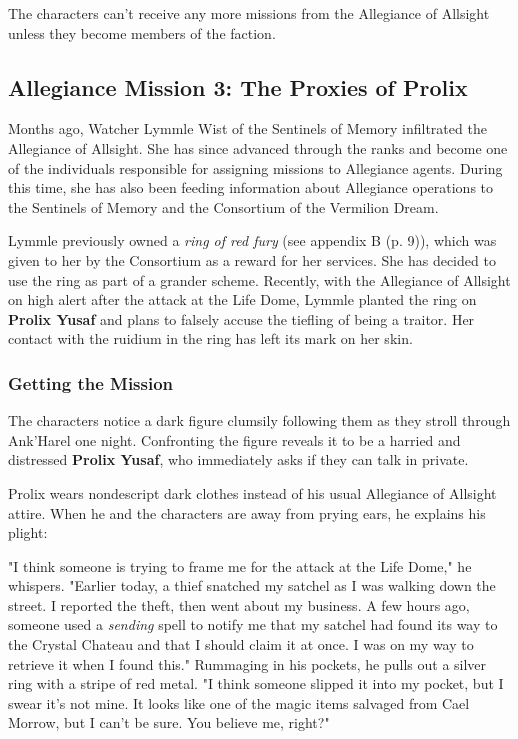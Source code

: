 \documentclass[a4paper, 11pt, bg=full, twocolumn, nooutline]{dndbook}
\begin{document}
The characters can't receive any more missions from the Allegiance of Allsight unless they become members of the faction.

\subsection{Allegiance Mission 3: The Proxies of Prolix}

Months ago, Watcher Lymmle Wist of the Sentinels of Memory infiltrated the Allegiance of Allsight. She has since advanced through the ranks and become one of the individuals responsible for assigning missions to Allegiance agents. During this time, she has also been feeding information about Allegiance operations to the Sentinels of Memory and the Consortium of the Vermilion Dream.

Lymmle previously owned a \textit{ring of red fury} (see appendix B (p. 9)), which was given to her by the Consortium as a reward for her services. She has decided to use the ring as part of a grander scheme. Recently, with the Allegiance of Allsight on high alert after the attack at the Life Dome, Lymmle planted the ring on \textbf{Prolix Yusaf} and plans to falsely accuse the tiefling of being a traitor. Her contact with the ruidium in the ring has left its mark on her skin.

\subsubsection{Getting the Mission}

The characters notice a dark figure clumsily following them as they stroll through Ank'Harel one night. Confronting the figure reveals it to be a harried and distressed \textbf{Prolix Yusaf}, who immediately asks if they can talk in private.

Prolix wears nondescript dark clothes instead of his usual Allegiance of Allsight attire. When he and the characters are away from prying ears, he explains his plight:

\begin{DndReadAloud}
"I think someone is trying to frame me for the attack at the Life Dome," he whispers.
"Earlier today, a thief snatched my satchel as I was walking down the street. I reported the theft, then went about my business. A few hours ago, someone used a \textit{sending} spell to notify me that my satchel had found its way to the Crystal Chateau and that I should claim it at once. I was on my way to retrieve it when I found this."
Rummaging in his pockets, he pulls out a silver ring with a stripe of red metal. "I think someone slipped it into my pocket, but I swear it's not mine. It looks like one of the magic items salvaged from Cael Morrow, but I can't be sure. You believe me, right?"
\end{DndReadAloud}
\end{document}
